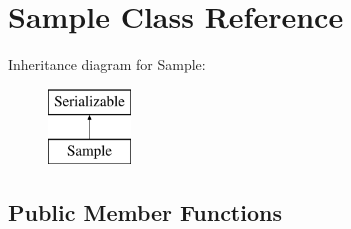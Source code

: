 \hypertarget{classSample}{\section{Sample Class Reference}
\label{classSample}
}
Inheritance diagram for Sample\-:\begin{figure}[H]
\begin{center}
\leavevmode
\includegraphics[height=2.000000cm]{classSample}
\end{center}
\end{figure}
\subsection*{Public Member Functions}
